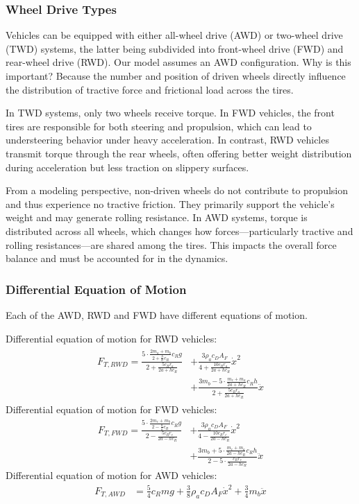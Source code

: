 \subsubsection*{Wheel Drive Types}
	Vehicles can be equipped with either all-wheel drive (AWD) or two-wheel drive (TWD) systems, the latter being subdivided into front-wheel drive (FWD) and rear-wheel drive (RWD). Our model assumes an AWD configuration. Why is this important? Because the number and position of driven wheels directly influence the distribution of tractive force and frictional load across the tires.
	
	In TWD systems, only two wheels receive torque. In FWD vehicles, the front tires are responsible for both steering and propulsion, which can lead to understeering behavior under heavy acceleration. In contrast, RWD vehicles transmit torque through the rear wheels, often offering better weight distribution during acceleration but less traction on slippery surfaces.
	
	From a modeling perspective, non-driven wheels do not contribute to propulsion and thus experience no tractive friction. They primarily support the vehicle's weight and may generate rolling resistance. In AWD systems, torque is distributed across all wheels, which changes how forces—particularly tractive and rolling resistances—are shared among the tires. This impacts the overall force balance and must be accounted for in the dynamics.
	
\subsubsection*{Differential Equation of Motion}
	Each of the AWD, RWD and FWD have different equations of motion.
	
	Differential equation of motion for RWD vehicles:
	\begin{align*}
		\begin{split}
			F_{T,RWD} = \frac{5\cdot\frac{2m_a + m_b}{2 + \frac{h}{a}c_R}c_Rg}{2 + \frac{5c_Rr_a}{2a+hc_R}} & + \frac{3\rho_a c_D A_F}{4 + \frac{10c_Rr_a}{2a+hc_R}}\dot x^2 \\
				& + \frac{3m_b - 5\cdot\frac{m_c+m_a}{2a + hc_R}c_Rh}{{2 + \frac{5c_Rr_a}{2a+hc_R}}}\ddot x
		\end{split}
	\end{align*}
	Differential equation of motion for FWD vehicles:
	\begin{align*}
		F_{T,FWD} = \frac{ 5\cdot\frac{2m_c + m_b}{2 - \frac{h}{a}c_R}c_Rg}{2 - \frac{5c_Rr_c}{2a-hc_R}} &  + \frac{3\rho_a c_D A_F}{4 - \frac{10c_Rr_c}{2a-hc_R}}\dot x^2 \\
			& + \frac{3m_b + 5\cdot\frac{m_c+m_a}{2a - hc_R}c_Rh}{2 - 5\cdot\frac{c_Rr_c}{2a-hc_R}}\ddot x 
	\end{align*}
	Differential equation of motion for AWD vehicles:
	\begin{align*}
		F_{T,AWD} & = \frac{5}{4}c_Rmg  + \frac{3}{8}\rho_a c_D A_F \dot x^2 + \frac{3}{4}m_b\ddot x
	\end{align*}